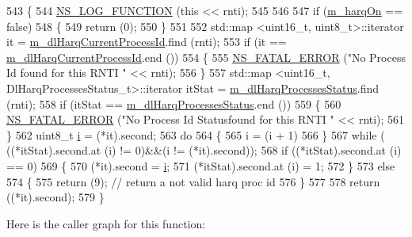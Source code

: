 \begin{DoxyCode}
543 \{
544   \hyperlink{log-macros-disabled_8h_a90b90d5bad1f39cb1b64923ea94c0761}{NS\_LOG\_FUNCTION} (\textcolor{keyword}{this} << rnti);
545 
546 
547   \textcolor{keywordflow}{if} (\hyperlink{classns3_1_1RrFfMacScheduler_aa57694b4b80d2dc907f1e5281d3defab}{m\_harqOn} == \textcolor{keyword}{false})
548     \{
549       \textcolor{keywordflow}{return} (0);
550     \}
551 
552   std::map <uint16\_t, uint8\_t>::iterator it = \hyperlink{classns3_1_1RrFfMacScheduler_a1e8b17ba5e424b3d11c217b32c41faac}{m\_dlHarqCurrentProcessId}.find (rnti);
553   \textcolor{keywordflow}{if} (it == \hyperlink{classns3_1_1RrFfMacScheduler_a1e8b17ba5e424b3d11c217b32c41faac}{m\_dlHarqCurrentProcessId}.end ())
554     \{
555       \hyperlink{group__fatal_ga5131d5e3f75d7d4cbfd706ac456fdc85}{NS\_FATAL\_ERROR} (\textcolor{stringliteral}{"No Process Id found for this RNTI "} << rnti);
556     \}
557   std::map <uint16\_t, DlHarqProcessesStatus\_t>::iterator itStat = 
      \hyperlink{classns3_1_1RrFfMacScheduler_aa3d12b5abcb9afeea093150a6572aaed}{m\_dlHarqProcessesStatus}.find (rnti);
558   \textcolor{keywordflow}{if} (itStat == \hyperlink{classns3_1_1RrFfMacScheduler_aa3d12b5abcb9afeea093150a6572aaed}{m\_dlHarqProcessesStatus}.end ())
559     \{
560       \hyperlink{group__fatal_ga5131d5e3f75d7d4cbfd706ac456fdc85}{NS\_FATAL\_ERROR} (\textcolor{stringliteral}{"No Process Id Statusfound for this RNTI "} << rnti);
561     \}
562   uint8\_t \hyperlink{bernuolliDistribution_8m_a6f6ccfcf58b31cb6412107d9d5281426}{i} = (*it).second;
563   \textcolor{keywordflow}{do}
564     \{
565       i = (i + 1) %
566     \}
567   \textcolor{keywordflow}{while} ( ((*itStat).second.at (i) != 0)&&(i != (*it).second));
568   \textcolor{keywordflow}{if} ((*itStat).second.at (i) == 0)
569     \{
570       (*it).second = \hyperlink{bernuolliDistribution_8m_a6f6ccfcf58b31cb6412107d9d5281426}{i};
571       (*itStat).second.at (i) = 1;
572     \}
573   \textcolor{keywordflow}{else}
574     \{
575       \textcolor{keywordflow}{return} (9); \textcolor{comment}{// return a not valid harq proc id}
576     \}
577 
578   \textcolor{keywordflow}{return} ((*it).second);
579 \}
\end{DoxyCode}


Here is the caller graph for this function\+:


